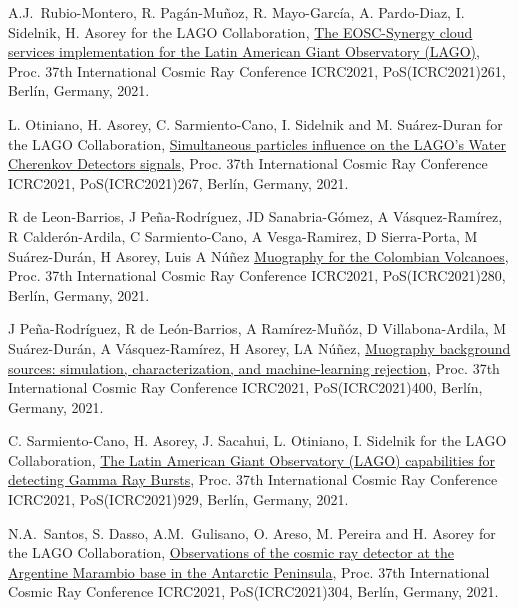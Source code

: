 \begin{etaremune}
\item {} A.J.\ Rubio-Montero, R. Pagán-Muñoz, R. Mayo-García, A. Pardo-Diaz, I. Sidelnik, H. Asorey for the LAGO Collaboration, \href{https://doi.org/10.22323/1.395.0261}{The EOSC-Synergy cloud services implementation for the Latin American Giant Observatory (LAGO)}, \en Proc.
37th International Cosmic Ray Conference ICRC2021, PoS(ICRC2021)261, Berlín, Germany, 2021.

\item {} L. Otiniano, H. Asorey, C. Sarmiento-Cano, I. Sidelnik and M. Suárez-Duran for the LAGO Collaboration, \href{https://doi.org/10.22323/1.395.0267}{Simultaneous particles influence on the LAGO’s Water Cherenkov Detectors signals}, \en Proc.
37th International Cosmic Ray Conference ICRC2021, PoS(ICRC2021)267, Berlín, Germany, 2021.

\item {} R de Leon-Barrios, J Peña-Rodríguez, JD Sanabria-Gómez, A Vásquez-Ramírez, R Calderón-Ardila, C Sarmiento-Cano, A Vesga-Ramirez, D Sierra-Porta, M Suárez-Durán, H Asorey, Luis A Núñez \href{https://doi.org/10.22323/1.395.0280}{Muography for the Colombian Volcanoes}, \en Proc.
37th International Cosmic Ray Conference ICRC2021, PoS(ICRC2021)280, Berlín, Germany, 2021.

\item {} J Peña-Rodríguez, R de León-Barrios, A Ramírez-Muñóz, D Villabona-Ardila, M Suárez-Durán, A Vásquez-Ramírez, H Asorey, LA Núñez, \href{https://doi.org/10.22323/1.395.0400}{Muography background sources: simulation, characterization, and machine-learning rejection}, \en Proc.
37th International Cosmic Ray Conference ICRC2021, PoS(ICRC2021)400, Berlín, Germany, 2021.

\item {} C. Sarmiento-Cano, H. Asorey, J. Sacahui, L. Otiniano, I. Sidelnik for the LAGO Collaboration, \href{https://doi.org/10.22323/1.395.0929}{The Latin American Giant Observatory (LAGO) capabilities for detecting Gamma Ray Bursts}, \en Proc.
37th International Cosmic Ray Conference ICRC2021, PoS(ICRC2021)929, Berlín, Germany, 2021.

\item {} N.A.\ Santos, S. Dasso, A.M.\ Gulisano, O. Areso, M. Pereira and H. Asorey for the LAGO Collaboration, \href{https://doi.org/10.22323/1.395.304}{Observations of the cosmic ray detector at the Argentine Marambio base in the Antarctic Peninsula}, \en Proc.
37th International Cosmic Ray Conference ICRC2021, PoS(ICRC2021)304, Berlín, Germany, 2021.


\end{etaremune}
